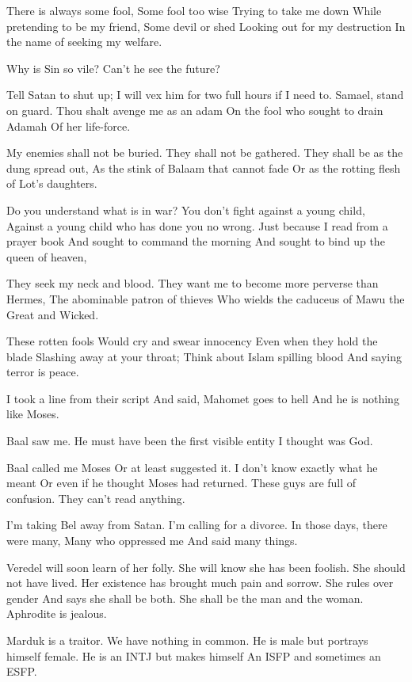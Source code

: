 \documentclass[
]{book}
\begin{document}
There is always some fool,
Some fool too wise
Trying to take me down
While pretending to be my friend,
Some devil or shed
Looking out for my destruction
In the name of seeking my welfare.

Why is Sin so vile?
Can't he see the future?

Tell Satan to shut up;
I will vex him for two full hours if I need to.
Samael, stand on guard.
Thou shalt avenge me as an adam
On the fool who sought to drain Adamah
Of her life-force.

My enemies shall not be buried.
They shall not be gathered.
They shall be as the dung spread out,
As the stink of Balaam that cannot fade
Or as the rotting flesh of Lot's daughters.

Do you understand what is in war?
You don't fight against a young child,
Against a young child who has done you no wrong.
Just because I read from a prayer book
And sought to command the morning
And sought to bind up the queen of heaven,

They seek my neck and blood.
They want me to become more perverse than Hermes,
The abominable patron of thieves
Who wields the caduceus of Mawu the Great and Wicked.

These rotten fools
Would cry and swear innocency
Even when they hold the blade
Slashing away at your throat;
Think about Islam spilling blood
And saying terror is peace.

I took a line from their script
And said, Mahomet goes to hell
And he is nothing like Moses.

Baal saw me.
He must have been the first visible entity
I thought was God.

Baal called me Moses
Or at least suggested it.
I don't know exactly what he meant
Or even if he thought Moses had returned.
These guys are full of confusion.
They can't read anything.

I'm taking Bel away from Satan.
I'm calling for a divorce.
In those days, there were many,
Many who oppressed me
And said many things.

Veredel will soon learn of her folly.
She will know she has been foolish.
She should not have lived.
Her existence has brought much pain and sorrow.
She rules over gender
And says she shall be both.
She shall be the man and the woman.
Aphrodite is jealous.

Marduk is a traitor.
We have nothing in common.
He is male but portrays himself female.
He is an INTJ but makes himself
An ISFP and sometimes an ESFP.
\end{document}
